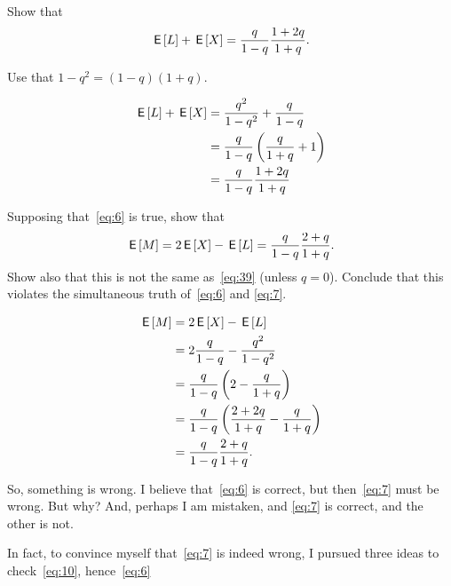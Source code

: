 \documentclass[a4paper,11pt]{article}
\begin{document}
\begin{exercise}
Show that 
\begin{equation}
  \label{eq:39}
\,\mathsf{E}\left[L\right] + \,\mathsf{E}\left[X\right] = \frac q{1-q}\frac{1+2q}{1+q}.
\end{equation}
\begin{hint}
Use that $1-q^2=(1-q)(1+q)$.
\end{hint}
\begin{solution}
  \begin{align}
    \label{eq:2}
\,\mathsf{E}\left[L\right]     + \,\mathsf{E}\left[X\right] 
&= \frac{q^{2}}{1-q^2} + \frac{q}{1-q} \\
&= \frac q{1-q}\left(\frac{q}{1+q} + 1\right)\\
&= \frac q{1-q} \frac{1+2q}{1+q}
  \end{align}
\end{solution}
\end{exercise}

\begin{exercise}
Supposing that~\cref{eq:6} is true, show that
\begin{equation}
  \label{eq:10}
\,\mathsf{E}\left[M\right] = 2\,\mathsf{E}\left[X\right]  -\,\mathsf{E}\left[L\right] = \frac q{1-q} \frac{2+q}{1+q}.
\end{equation}
Show also that this is not the same as~\cref{eq:39} (unless $q=0$).
Conclude that this violates the simultaneous truth of~\cref{eq:6} and \cref{eq:7}.
\begin{solution}
  \begin{align}
    \label{eq:11}
\,\mathsf{E}\left[M\right] 
&= 2\,\mathsf{E}\left[X\right] - \,\mathsf{E}\left[L\right] \\
&= 2\frac q{1-q}  - \frac{q^2}{1-q^2}\\
&= \frac q{1-q}\left(2  - \frac{q}{1+q}\right)\\
&= \frac q{1-q}\left(\frac{2+2q}{1+q}  - \frac{q}{1+q}\right)\\
&= \frac q{1-q}\frac{2+q}{1+q}.
  \end{align}
\end{solution}
\end{exercise}


So, something is wrong.
I believe that~\cref{eq:6} is correct, but then~\cref{eq:7} must be wrong.
But why?
And, perhaps I am mistaken, and \cref{eq:7} is correct, and the other is not.

In fact, to convince myself that~\cref{eq:7} is indeed wrong, I pursued three ideas to check~\cref{eq:10}, hence~\cref{eq:6}
\end{document}
